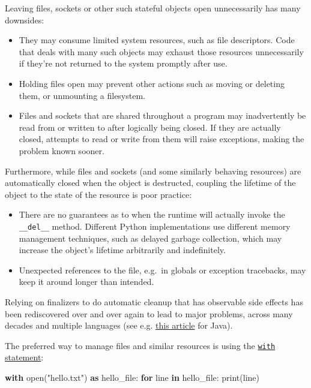 \documentclass[
]{article}
\newenvironment{Shaded}{}{}
\newcommand{\BuiltInTok}[1]{\textcolor[rgb]{0.00,0.50,0.00}{#1}}
\newcommand{\ControlFlowTok}[1]{\textcolor[rgb]{0.00,0.44,0.13}{\textbf{#1}}}
\newcommand{\ImportTok}[1]{\textcolor[rgb]{0.00,0.50,0.00}{\textbf{#1}}}
\newcommand{\KeywordTok}[1]{\textcolor[rgb]{0.00,0.44,0.13}{\textbf{#1}}}
\newcommand{\NormalTok}[1]{#1}
\newcommand{\StringTok}[1]{\textcolor[rgb]{0.25,0.44,0.63}{#1}}
\providecommand{\tightlist}{%
  \setlength{\itemsep}{0pt}\setlength{\parskip}{0pt}}
\begin{document}
Leaving files, sockets or other such stateful objects open unnecessarily
has many downsides:

\begin{itemize}
\tightlist
\item
  They may consume limited system resources, such as file descriptors.
  Code that deals with many such objects may exhaust those resources
  unnecessarily if they're not returned to the system promptly after
  use.
\item
  Holding files open may prevent other actions such as moving or
  deleting them, or unmounting a filesystem.
\item
  Files and sockets that are shared throughout a program may
  inadvertently be read from or written to after logically being closed.
  If they are actually closed, attempts to read or write from them will
  raise exceptions, making the problem known sooner.
\end{itemize}

Furthermore, while files and sockets (and some similarly behaving
resources) are automatically closed when the object is destructed,
coupling the lifetime of the object to the state of the resource is poor
practice:

\begin{itemize}
\tightlist
\item
  There are no guarantees as to when the runtime will actually invoke
  the \texttt{\_\_del\_\_} method. Different Python implementations use
  different memory management techniques, such as delayed garbage
  collection, which may increase the object's lifetime arbitrarily and
  indefinitely.
\item
  Unexpected references to the file, e.g.~in globals or exception
  tracebacks, may keep it around longer than intended.
\end{itemize}

Relying on finalizers to do automatic cleanup that has observable side
effects has been rediscovered over and over again to lead to major
problems, across many decades and multiple languages (see e.g.
\href{https://wiki.sei.cmu.edu/confluence/display/java/MET12-J.+Do+not+use+finalizers}{this
article} for Java).

The preferred way to manage files and similar resources is using the
\href{http://docs.python.org/reference/compound_stmts.html\#the-with-statement}{\texttt{with}
statement}:

\begin{samepage}
\begin{Shaded}
\begin{Highlighting}[]
\ControlFlowTok{with} \BuiltInTok{open}\NormalTok{(}\StringTok{"hello.txt"}\NormalTok{) }\ImportTok{as}\NormalTok{ hello\_file:}
    \ControlFlowTok{for}\NormalTok{ line }\KeywordTok{in}\NormalTok{ hello\_file:}
        \BuiltInTok{print}\NormalTok{(line)}
\end{Highlighting}
\end{Shaded}
\end{samepage}
\end{document}
